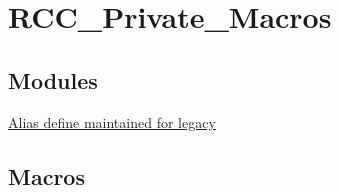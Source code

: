 \hypertarget{group___r_c_c___private___macros}{}\section{R\+C\+C\+\_\+\+Private\+\_\+\+Macros}
\label{group___r_c_c___private___macros}
\subsection*{Modules}
\begin{DoxyCompactItemize}
\item 
\hyperlink{group___r_c_c___alias___for___legacy}{Alias define maintained for legacy}
\end{DoxyCompactItemize}
\subsection*{Macros}

